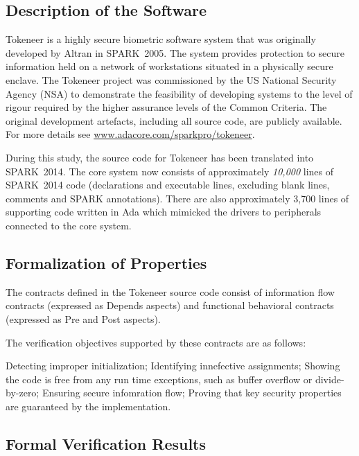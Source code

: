 \documentclass[10pt,a4paper,twocolumn]{article}
\newcommand{\oldspark}{SPARK~2005\xspace}
\newcommand{\newspark}{SPARK~2014\xspace}
\begin{document}

\subsection{Description of the Software}

Tokeneer is a highly secure biometric software system that was originally
developed by Altran in \oldspark. The system provides protection to secure
information held on a network of workstations situated in a physically
secure enclave. The Tokeneer project was commissioned by the US National
Security Agency (NSA) to demonstrate the feasibility of developing systems
to the level of rigour required by the higher assurance levels of the
Common Criteria. The original development artefacts, including all source code,
are publicly available. For more details see
\url{www.adacore.com/sparkpro/tokeneer}.

During this study, the source code for Tokeneer has been translated into \newspark.
The core system now consists of approximately \emph{10,000} lines of \newspark code
(declarations and executable lines, excluding blank lines, comments and
SPARK annotations). There are also approximately 3,700 lines of supporting
code written in Ada which mimicked the drivers to peripherals connected
to the core system.


\subsection{Formalization of Properties}

The contracts defined in the Tokeneer source code consist of information flow contracts (expressed as Depends aspects) and functional behavioral contracts (expressed as Pre and Post aspects).

The verification objectives supported by these contracts are as follows:

 Detecting improper initialization;
 Identifying innefective assignments;
 Showing the code is free from any run time exceptions, such as buffer overflow or divide-by-zero;
 Ensuring secure infomration flow;
 Proving that key security properties are guaranteed by the implementation.


\subsection{Formal Verification Results}
\end{document}
